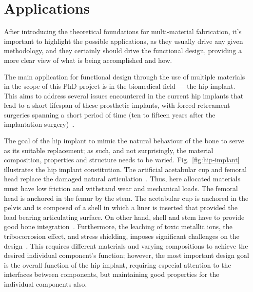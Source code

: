 \section{Applications}%
\label{sec:applications}

After introducing the theoretical foundations for multi-material fabrication,
it's important to highlight the possible applications, as they usually drive
any given methodology, and they certainly should drive the functional design,
providing a more clear view of what is being accomplished and how.

The main application for functional design through the use of multiple materials
in the scope of this PhD project is in the biomedical field --- the hip implant.
This aims to address several issues encountered in the current hip implants that
lead to a short lifespan of these prosthetic implants, with forced
retreament surgeries spanning a short period of time (ten to fifteen years after
the implantation surgery)~\cite{soliman2022review}.


The goal of the hip implant to mimic the natural behaviour of the bone to serve
as its suitable replacement; as such, and not surprisingly, the material
composition, properties and structure needs to be varied.
Fig.~\ref{fig:hip-implant} illustrates the hip implant constitution. The artificial acetabular cup and
femoral head replace the damaged natural articulation~\cite{derar2015recent}. Thus, here
allocated materials must have low friction and withstand wear and mechanical
loads. The femoral head is anchored in the femur by the stem.
The acetabular cup
is anchored in the pelvis and is composed of a shell in which a liner is
inserted that provided the load bearing articulating surface.
On other hand, shell and stem have to provide good bone
integration~\cite{eltit2019mechanisms}. Furthermore, the leaching of toxic
metallic ions, the tribocorrosion effect, and stress shielding, imposes
significant challenges on the design~\cite{rafiq2022review}.
%
This requires different materials and varying compositions to achieve the
desired individual component's function; however, the most important design goal is the
overall function of the hip implant, requiring especial attention to the
interfaces between components, but maintaining good properties for the
individual components also.

